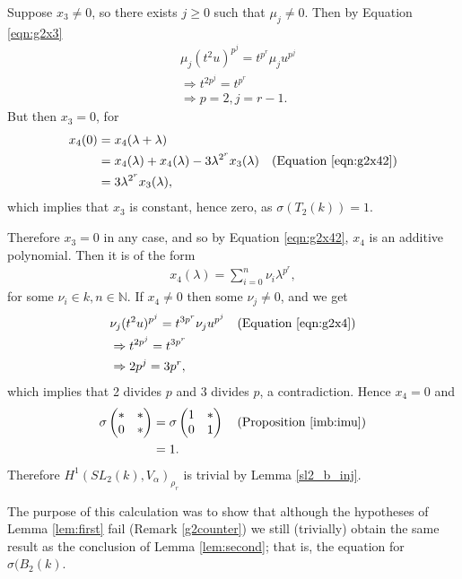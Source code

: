 	Suppose $x_3\neq 0$, so there exists $j\geq 0$ such that $\mu_j\neq 0$. Then by Equation \ref{eqn:g2x3}
	\begin{align*}
	&\mu_j (t^2u)^{p^j} = t^{p^r}\mu_j u^{p^j}\\
		&\Rightarrow t^{2p^j} = t^{p^r}\\
		&\Rightarrow p = 2, j = r-1.
		\end{align*}
		But then $x_3 = 0$, for
		\begin{align*}
		x_4(0) &= x_4(\lambda + \lambda) \\
							&= x_4(\lambda)+x_4(\lambda)-3\lambda^{2^r}x_3(\lambda)\quad(\textrm{Equation \ref{eqn:g2x42}}) \\
							&= 3\lambda^{2^r}x_3(\lambda),
		\end{align*}
		which implies that $x_3$ is constant, hence zero, as $\sigma(T_2(k)) = 1$.

		Therefore $x_3 = 0$ in any case, and so by Equation \ref{eqn:g2x42}, $x_4$ is an additive polynomial. Then it is of the form
		\begin{align*}
		x_4(\lambda) = \sum_{i=0}^n \nu_i \lambda^{p^r},
		\end{align*}
		for some $\nu_i \in k, n\in\mathbb{N}$.
		If $x_4\neq 0$ then some $\nu_j\neq 0$, and we get
		\begin{align*}
		&\nu_j(t^2u)^{p^j} = t^{3p^r}\nu_j u^{p^j}\quad(\textrm{Equation \ref{eqn:g2x4}})\\
			&\Rightarrow t^{2p^j} = t^{3p^r}\\
			&\Rightarrow 2p^j = 3p^r,
		\end{align*}
		which implies that 2 divides $p$ and 3 divides $p$, a contradiction. Hence $x_4=0$ and
		\begin{align*}
		\sigma\left(\begin{matrix}* & *\\0 & *\end{matrix}\right) &= \sigma\left(\begin{matrix}1 & *\\0 & 1\end{matrix}\right) \quad(\textrm{Proposition \ref{imb:imu}}) \\
			&= 1.
			\end{align*}
			Therefore $H^1(SL_2(k), V_\alpha)_{\rho_r}$ is trivial by Lemma \ref{sl2_b_inj}.

The purpose of this calculation was to show that although the hypotheses of Lemma \ref{lem:first} fail (Remark \ref{g2counter}) we still (trivially) obtain the same result as the conclusion of Lemma \ref{lem:second}; that is, the equation for $\sigma(B_2(k)$.

